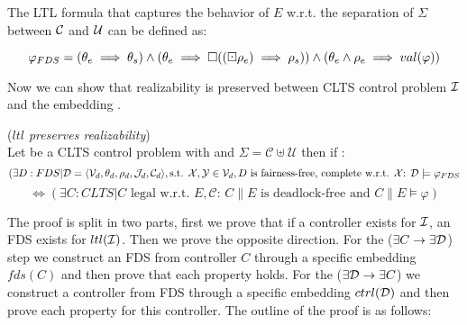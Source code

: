 
The LTL formula that captures the behavior of $E$ w.r.t. the separation of $\Sigma$ between $\mathcal{C}$ and $\mathcal{U}$ can be defined as:

\[ \varphi_{FDS} = (\theta_e \implies \theta_s) \wedge (\theta_e \implies \square((\boxdot \rho_e) \implies \rho_s)) \wedge (\theta_e \wedge \rho_e \implies val(\varphi)) \]

Now we can show that realizability is preserved between CLTS control problem $\mathcal{I}$ and the embedding \fdsEmbedding.

\begin{theorem}(\emph{$ltl$ preserves realizability})\label{theorem:gs_preserves_realizability}\\
	Let \controlProblemDef be a CLTS control problem with  and $\Sigma = \mathcal{C}\uplus \mathcal{U}$ then if \fdsEmbeddingDef:
	\small
	\[(\exists D:FDS|\mathcal{D}= \langle \mathcal{V}_d, \theta_d, \rho_d, \mathcal{J}_d, \mathcal{C}_d\rangle, \text{s.t. }    {\mathcal{X}}, {\mathcal{Y}} \in \mathcal{V}_d, D \text{ is fairness-free, complete w.r.t. } {\mathcal{X}} \text{: } \mathcal{D} \models \varphi_{FDS}\]
	 \[ \iff (\exists C:CLTS| C \text{ legal w.r.t. } E,\mathcal{C} \text{: } C \parallel E \text{ is deadlock-free and } C \parallel E \models \varphi)  \]
	\normalsize
\end{theorem}


The proof is split in two parts, first we prove that if a controller exists for $\mathcal{I}$, an FDS exists for $ltl(\mathcal{I})$. Then we prove the opposite direction. For the ($\exists C \rightarrow \exists \mathcal{D}$) step we construct an FDS from controller $C$ through a specific embedding $fds(C)$ and then prove that each property holds. For the ($\exists \mathcal{D} \rightarrow \exists C$) we construct a controller from FDS \fdsD through a specific embedding $ctrl(\mathcal{D})$ and then prove each property for this controller. The outline of the proof is as follows:

